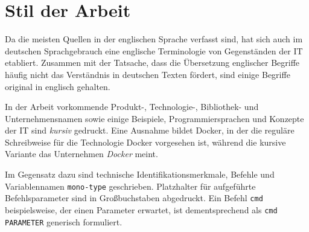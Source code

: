 \documentclass[../main.tex]{subfiles}
\begin{document}
  \section{Stil der Arbeit}
    Da die meisten Quellen in der englischen Sprache verfasst sind, hat sich auch im deutschen Sprachgebrauch eine englische Terminologie von Gegenständen der IT etabliert. Zusammen mit der Tatsache, dass die Übersetzung englischer Begriffe häufig nicht das Verständnis in deutschen Texten fördert, sind einige Begriffe original in englisch gehalten.

    In der Arbeit vorkommende Produkt-, Technologie-, Bibliothek- und Unternehmensnamen sowie einige Beispiele, Programmiersprachen und Konzepte der IT sind \emph{kursiv} gedruckt. Eine Ausnahme bildet Docker, in der die reguläre Schreibweise für die Technologie Docker vorgesehen ist, während die kursive Variante das Unternehmen \emph{Docker} meint.

    Im Gegensatz dazu sind technische Identifikationsmerkmale, Befehle und Variablennamen \texttt{mono-type} geschrieben. Platzhalter für aufgeführte Befehlsparameter sind in Großbuchstaben abgedruckt. Ein Befehl \texttt{cmd} beispielsweise, der einen Parameter erwartet, ist dementsprechend als \texttt{cmd PARAMETER} generisch formuliert.
\end{document}

